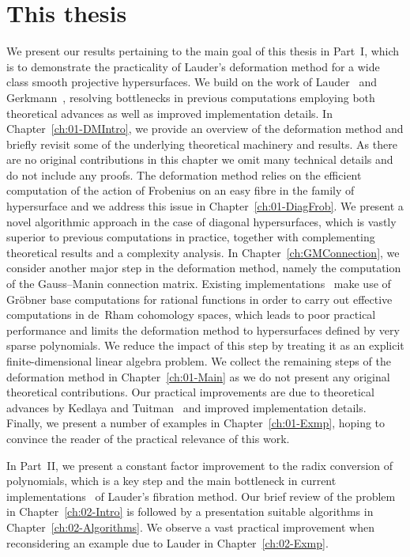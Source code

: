 \section{This thesis}

We present our results pertaining to the main goal of this thesis in 
Part~{I}, which is to demonstrate the practicality of Lauder's deformation 
method for a wide class smooth projective hypersurfaces.  We build on 
the work of Lauder~\citep{Lau04a} and Gerkmann~\citep{Gerkmann2007}, 
resolving bottlenecks in previous computations employing both theoretical 
advances as well as improved implementation details.  
In Chapter~\ref{ch:01-DMIntro}, we provide an overview of the deformation 
method and briefly revisit some of the underlying theoretical machinery 
and results.  As there are no original contributions in this chapter we 
omit many technical details and do not include any proofs.  
The deformation method relies on the efficient computation of the 
action of Frobenius on an easy fibre in the family of hypersurface 
and we address this issue in Chapter~\ref{ch:01-DiagFrob}.  We present 
a novel algorithmic approach in the case of diagonal hypersurfaces, 
which is vastly superior to previous computations in practice, together 
with complementing theoretical results and a complexity analysis.
In Chapter~\ref{ch:GMConnection}, we consider another major step in the 
deformation method, namely the computation of the Gauss--Manin connection 
matrix.  Existing implementations~\citep{Lau04a,Gerkmann2007,Kedlaya2011} 
make use of Gr\"obner base computations for rational functions in order 
to carry out effective computations in de~Rham cohomology spaces, which 
leads to poor practical performance and limits the deformation method to 
hypersurfaces defined by very sparse polynomials.  We reduce the impact 
of this step by treating it as an explicit finite-dimensional linear 
algebra problem.  We collect the remaining steps of the deformation 
method in Chapter~\ref{ch:01-Main}  as we do not present any original 
theoretical contributions.  Our practical improvements are due to 
theoretical advances by Kedlaya and Tuitman~\citep{KedlayaTuitman2012} 
and improved implementation details.  Finally, we present a number of 
examples in Chapter~\ref{ch:01-Exmp}, hoping to convince the reader of 
the practical relevance of this work.

In Part~{II}, we present a constant factor improvement to the 
radix conversion of polynomials, which is a key step and the 
main bottleneck in current implementations~\citep{Lauder2006,Walker2009} 
of Lauder's fibration method.  Our brief review of the problem 
in Chapter~\ref{ch:02-Intro} is followed by a presentation suitable 
algorithms in Chapter~\ref{ch:02-Algorithms}.  We observe a vast 
practical improvement when reconsidering an example due to Lauder 
in Chapter~\ref{ch:02-Exmp}.

